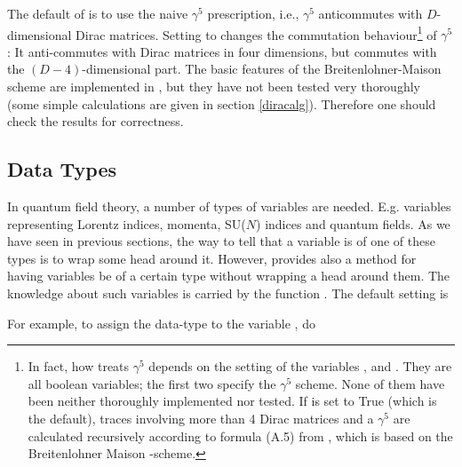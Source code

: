 The default of  \fc is to use the naive $\gamma^{5}$ prescription, i.e.,
$\gamma^{5}$ anticommutes with $D$-dimensional Dirac matrices.
Setting  to  changes the commutation behaviour\footnote{
In fact, how \fc treats $\gamma^5$ depends on the setting of the variables ,  and . They are all boolean variables; the first two specify the $\gamma^5$ scheme. None of them have been neither thoroughly implemented nor tested. If  is set to True (which is the default), traces involving more than 4 Dirac matrices and a $\gamma^5$ are calculated recursively according to formula (A.5) from \cite{west}, which is based on the Breitenlohner Maison -scheme.
} of $\gamma^{5}$: It anti-commutes with Dirac matrices in four dimensions, 
but commutes with the $(D-4)$-dimensional part.
The basic features of the Breitenlohner-Maison scheme are implemented in 
\fc, but they have not been tested  very thoroughly (some simple 
calculations are given in section \ref{diracalg}). 
Therefore one should check the results for correctness.

\subsection{Data Types}
\label{datatypes}

In quantum field theory, a number of types of variables are needed. E.g. variables representing Lorentz indices, momenta, SU($N$) indices and quantum fields. As we have seen in previous sections, the way to tell \fc that a variable is of one of these types is to wrap some head around it. However, \fc provides also a method for having variables be of a certain type without wrapping a head around them. The knowledge about such variables is carried by the function . The default setting is


For example, to assign the data-type  to the variable , do



